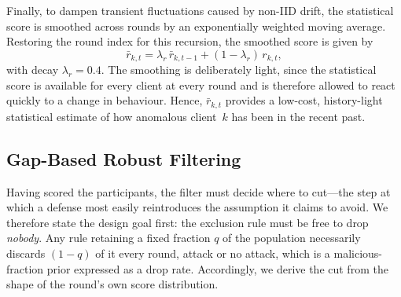 \documentclass[journal]{IEEEtran}
\begin{document}
Finally, to dampen transient fluctuations caused by non-IID drift, the statistical score is smoothed across rounds by an exponentially weighted moving average. Restoring the round index for this recursion, the smoothed score is given by
\begin{equation}
\bar r_{k,t} = \lambda_r\,\bar r_{k,t-1} + (1-\lambda_r)\,r_{k,t},
\label{eq:stat_ewma}
\end{equation}
with decay $\lambda_r = 0.4$. The smoothing is deliberately light, since the statistical score is available for every client at every round and is therefore allowed to react quickly to a change in behaviour. Hence, $\bar r_{k,t}$ provides a low-cost, history-light statistical estimate of how anomalous client~$k$ has been in the recent past.

\subsection{Gap-Based Robust Filtering}
\label{sec:dual_threshold}

Having scored the participants, the filter must decide where to cut---the step at which a defense most easily reintroduces the assumption it claims to avoid. We therefore state the design goal first: the exclusion rule must be free to drop \emph{nobody}. Any rule retaining a fixed fraction $q$ of the population necessarily discards $(1-q)$ of it every round, attack or no attack, which is a malicious-fraction prior expressed as a drop rate. Accordingly, we derive the cut from the shape of the round's own score distribution.
\end{document}
